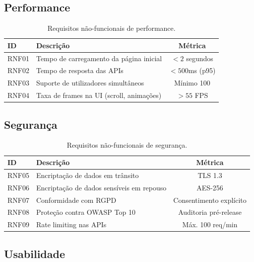 \subsection{Performance}

\begin{table}[H]
\centering
\caption{Requisitos não-funcionais de performance.}
\label{tab:rnf-perf}
\begin{tabularx}{\textwidth}{l X c}
\toprule
\textbf{ID} & \textbf{Descrição} & \textbf{Métrica} \\
\midrule
RNF01 & Tempo de carregamento da página inicial & $< 2$ segundos \\
RNF02 & Tempo de resposta das \ac{API}s & $< 500$ms (p95) \\
RNF03 & Suporte de utilizadores simultâneos & Mínimo 100 \\
RNF04 & Taxa de frames na \ac{UI} (scroll, animações) & $> 55$ FPS \\
\bottomrule
\end{tabularx}
\end{table}

\subsection{Segurança}

\begin{table}[H]
\centering
\caption{Requisitos não-funcionais de segurança.}
\label{tab:rnf-seg}
\begin{tabularx}{\textwidth}{l X c}
\toprule
\textbf{ID} & \textbf{Descrição} & \textbf{Métrica} \\
\midrule
RNF05 & Encriptação de dados em trânsito & \ac{TLS} 1.3 \\
RNF06 & Encriptação de dados sensíveis em repouso & AES-256 \\
RNF07 & Conformidade com \ac{RGPD} & Consentimento explícito \\
RNF08 & Proteção contra \ac{OWASP} Top 10 & Auditoria pré-release \\
RNF09 & Rate limiting nas \ac{API}s & Máx. 100 req/min \\
\bottomrule
\end{tabularx}
\end{table}

\subsection{Usabilidade}


